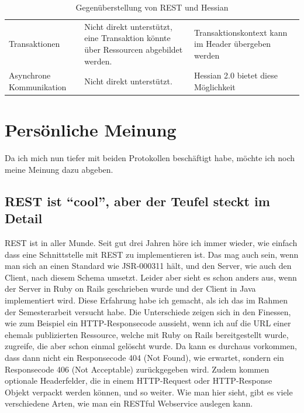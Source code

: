 \documentclass[abstracton, listof=totocnumbered,
bibliography=totocnumbered]{scrreprt}
\begin{document}
\begin{table}[h]
\begin{center}
\begin{tabular}{p{2.4cm}p{6.1cm}p{6.1cm}}
        \cmidrule{2-3}
        \nohyphens{Transaktionen} & Nicht direkt unterstützt, eine Transaktion
        könnte über Ressourcen abgebildet werden. & Transaktionskontext kann im Header übergeben
        werden\\
        \cmidrule{2-3}
        \nohyphens{Asynchrone Kommunikation} & Nicht direkt unterstützt. &
        Hessian 2.0 bietet diese Möglichkeit\\
        \bottomrule
      \end{tabular}
      \caption{Gegenüberstellung von REST und Hessian}
      \label{tab:gegenueberstellungRestHessian}
    \end{center}
  \end{table}
  
  \newpage
  
  \section{Persönliche Meinung}
  
  Da ich mich nun tiefer mit beiden Protokollen beschäftigt habe, möchte ich
  noch meine Meinung dazu abgeben.
  
  \subsection{REST ist ``cool'', aber der Teufel steckt im Detail}
  
  REST ist in aller Munde. Seit gut drei Jahren höre ich immer wieder, wie
  einfach dass eine Schnittstelle mit REST zu implementieren ist. Das mag auch
  sein, wenn man sich an einen Standard wie JSR-000311\cite{JSR311} hält, und
  den Server, wie auch den Client, nach diesem Schema umsetzt. Leider aber sieht
  es schon anders aus, wenn der Server in Ruby on Rails\cite{RoR} geschrieben
  wurde und der Client in Java implementiert wird. Diese Erfahrung habe ich
  gemacht, als ich das im Rahmen der Semesterarbeit versucht habe. Die
  Unterschiede zeigen sich in den Finessen, wie zum Beispiel ein
  HTTP-Responsecode aussieht, wenn ich auf die \ac{URL} einer ehemals
  publizierten Ressource, welche mit Ruby on Rails bereitgestellt wurde,
  zugreife, die aber schon einmal gelöscht wurde. Da kann es durchaus
  vorkommen, dass dann nicht ein Responsecode 404 (Not Found), wie erwartet, 
  sondern ein Responsecode 406 (Not Acceptable) zurückgegeben wird. Zudem kommen
  optionale Headerfelder, die in einem HTTP-Request oder HTTP-Response Objekt verpackt
  werden können, und so weiter. Wie man hier sieht, gibt es viele verschiedene
  Arten, wie man ein RESTful Webservice auslegen kann.
  
\end{document}
